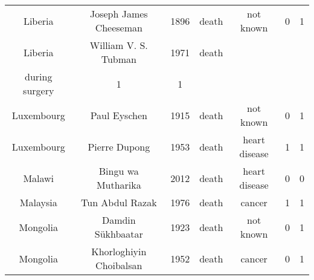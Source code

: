 \begin{center}
\begin{longtable}{ccccccc}
Liberia                                                                    & Joseph James Cheeseman                                                                & 1896       & death         & not known                                                              & 0        & 1       \\
Liberia                                                                    & William V. S. Tubman                                                                  & 1971       & death         & \begin{tabular}[c]{@{}c@{}}complications\\ during surgery\end{tabular} & 1        & 1       \\
Luxembourg                                                                 & Paul Eyschen                                                                          & 1915       & death         & not known                                                              & 0        & 1       \\
Luxembourg                                                                 & Pierre Dupong                                                                         & 1953       & death         & heart disease                                                          & 1        & 1       \\
Malawi                                                                     & Bingu wa Mutharika                                                                    & 2012       & death         & heart disease                                                          & 0        & 0       \\
Malaysia                                                                   & Tun Abdul Razak                                                                       & 1976       & death         & cancer                                                                 & 1        & 1       \\
Mongolia                                                                   & Damdin Sükhbaatar                                                                     & 1923       & death         & not known                                                              & 0        & 1       \\
Mongolia                                                                   & Khorloghiyin Choibalsan                                                               & 1952       & death         & cancer                                                                 & 0        & 1       \\

\end{longtable}
\end{center}
